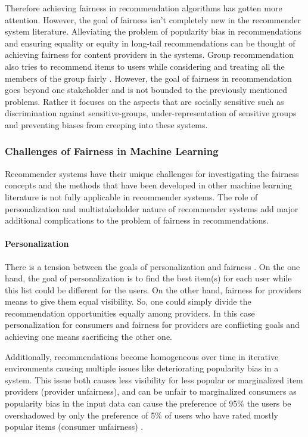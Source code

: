 Therefore achieving fairness in recommendation algorithms has gotten more attention. However, the goal of fairness isn't completely new in the recommender system literature. Alleviating the problem of popularity bias in recommendations \cite{popbias2018} and ensuring equality or equity in long-tail recommendations \cite{ferraro2019} can be thought of achieving fairness for content providers in the systems. Group recommendation also tries to recommend items to users while considering and treating all the members of the group fairly \cite{kaya2020}. However, the goal of fairness in recommendation goes beyond one stakeholder and is not bounded to the previously mentioned problems. Rather it focuses on the aspects that are socially sensitive such as discrimination against sensitive-groups, under-representation of sensitive groups and preventing biases from creeping into these systems.


\subsubsection{Challenges of Fairness in Machine Learning}
Recommender systems have their unique challenges for investigating the fairness concepts and the methods that have been developed in other machine learning literature is not fully applicable in recommender systems. The role of personalization and multistakeholder nature of recommender systems add major additional complications to the problem of fairness in recommendations.
    
\paragraph{Personalization}
There is a tension between the goals of personalization and fairness \cite{modani2017fairness}. On the one hand, the goal of personalization is to find the best item(s) for each user while this list could be different for the users. On the other hand, fairness for providers means to give them equal visibility. So, one could simply divide the recommendation opportunities equally among providers. In this case personalization for consumers and fairness for providers are conflicting goals and achieving one means sacrificing the other one.

Additionally, recommendations become homogeneous over time in iterative environments \cite{Chaney2018} causing multiple issues like deteriorating popularity bias in a system. This issue both causes less visibility for less popular or marginalized item providers (provider unfairness), and can be unfair to marginalized consumers as popularity bias in the input data can cause the preference of 95\% the users be overshadowed by only the preference of 5\% of users who have rated mostly popular items (consumer unfairness) \cite{Eskandanian2019power}.


